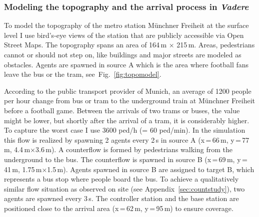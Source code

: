 \FloatBarrier


\subsubsection{Modeling the topography and the arrival process in \textit{Vadere}}
To model the topography  of the metro station Münchner Freiheit at the surface level I use bird's-eye views of the station that are publicly accessible via Open Street Maps. The topography spans an area of 164\,m $\times$ 215\,m. Areas, pedestrians cannot or should not step on, like buildings and major streets are modeled as obstacles. Agents are spawned in source A which is the area where football fans leave the bus or the tram, see~Fig.~\ref{fig:topomodel}.

According to the public transport provider of Munich, an average of 1200 people per hour change from bus or tram to the underground train at Münchner Freiheit before a football game. Between the arrivals of two trams or buses, the value might be lower, but shortly after the arrival of a tram, it is considerably higher. To capture the worst case I use 3600 ped/h (= 60 ped/min). In the simulation this flow is realized by spawning 2 agents every 2\,s in source A (x\,=\,66\,m, y\,=\,77\,m, 4.4\,m$\times$3.6\,m). A counterflow is formed by pedestrians walking from the underground to the bus. The counterflow is spawned in source B (x\,=\,69\,m, y\,=\,41\,m, 1.75\,m$\times$1.5\,m). Agents spawned in source B are assigned to target B, which represents a bus stop where people board the bus. To achieve a qualitatively similar flow situation as observed on site (see Appendix~\ref{sec:countstudy}), two agents are spawned every 3\,s. The controller station and the base station are positioned close to the arrival area (x\,=\,62\,m, y\,=\,95\,m) to ensure coverage.



